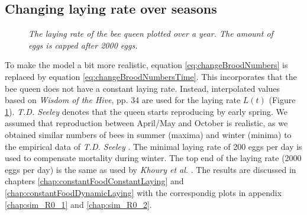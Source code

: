 	\subsection{Changing laying rate over seasons}
		\begin{figure}
			\centering
			\caption{\textit{The laying rate of the bee queen plotted over a year. The amount of eggs is capped after 2000 eggs.}}
			\label{fig:dynLayingRate}
		\end{figure}
		
		
		To make the model a bit more realistic, equation \ref{eq:changeBroodNumbers} is replaced by equation \ref{eq:changeBroodNumbersTime}. This incorporates that the bee queen does not have a constant laying rate. Instead, interpolated values based on \textit{Wisdom of the Hive}, pp. 34 \cite{seeley95} are used for the laying rate $L(t)$ (Figure \ref{fig:dynLayingRate}). \textit{T.D. Seeley} denotes that the queen starts reproducing by early spring. We assumed that reproduction between April/May and October is realistic, as we obtained similar numbers of bees in summer (maxima) and winter (minima) to the empirical data of \textit{T.D. Seeley} \cite{seeley95}. The minimal laying rate of 200 eggs per day is used to compensate mortality during winter. The top end of the laying rate (2000 eggs per day) is the same as used by \textit{Khoury et al.} \cite{khoury13}. The results are discussed in chapters \ref{chap:constantFoodConstantLaying} and \ref{chap:constantFoodDynamicLaying} with the correspondig plots in appendix \ref{chap:sim_R0_1} and \ref{chap:sim_R0_2}.
		
